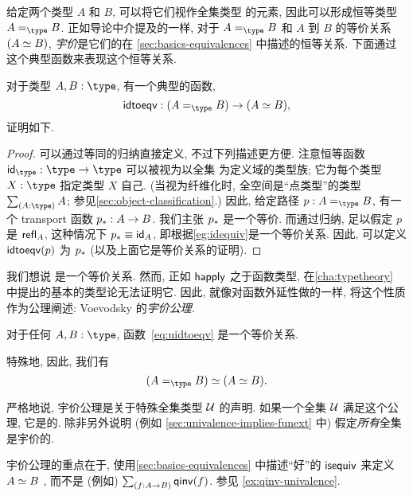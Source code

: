 %
%
给定两个类型 $A$ 和 $B$, 可以将它们视作全集类型 \type 的元素, 因此可以形成恒等类型 $\id[\type]AB$.
正如导论中介提及的一样, 对于 $\id[\type]AB$ 和 $A$ 到 $B$ 的等价关系 $(\eqv AB)$, \emph{宇价}是它们的在 \cref{sec:basics-equivalences} 中描述的恒等关系.
下面通过这个典型函数来表现这个恒等关系.

\begin{lem}\label{thm:idtoeqv}
  对于类型 $A,B:\type$, 有一个典型的函数,
  \begin{equation}\label{eq:uidtoeqv}
    \idtoeqv : (\id[\type]AB) \to (\eqv A B),
  \end{equation}
  证明如下.
\end{lem}
\begin{proof}
  可以通过等同的归纳直接定义, 不过下列描述更方便.
  注意恒等函数 $\idfunc[\type]:\type\to\type$ 可以被视为以全集 \type 为定义域的类型族; 它为每个类型 $X:\type$ 指定类型 $X$ 自己.
  (当视为纤维化时, 全空间是``点类型''的类型 $\sm{A:\type}A$; 参见\cref{sec:object-classification}.)
  因此, 给定路径 $p:A =_\type B$, 有一个 transport 函数 $\transf{p}:A \to B$.
  我们主张 $\transf{p}$ 是一个等价.
  而通过归纳, 足以假定 $p$ 是 $\refl A$, 这种情况下 $\transf{p} \jdeq \idfunc[A]$, 即根据\cref{eg:idequiv}是一个等价关系.
  因此, 可以定义 $\idtoeqv(p)$ 为 $\transf{p}$ (以及上面它是等价关系的证明).
\end{proof}

我们想说 \idtoeqv 是一个等价关系.
然而, 正如 $\happly$ 之于函数类型, 在\cref{cha:typetheory} 中提出的基本的类型论无法证明它.
因此, 就像对函数外延性做的一样, 将这个性质作为公理阐述: Voevodsky 的\emph{宇价公理}.

\begin{axiom}[Univalence]\label{axiom:univalence}
  对于任何 $A,B:\type$, 函数~\eqref{eq:uidtoeqv} 是一个等价关系.
\end{axiom}

特殊地, 因此, 我们有
  \[
\eqv{(\id[\type]{A}{B})}{(\eqv A B)}.
\]

严格地说, 宇价公理是关于特殊全集类型 $\UU$ 的声明.
如果一个全集 $\UU$ 满足这个公理, 它是的.
%
%
除非另外说明 (例如 \cref{sec:univalence-implies-funext} 中) 假定\emph{所有}全集是宇价的.

\begin{rmk}
  宇价公理的重点在于, 使用\cref{sec:basics-equivalences} 中描述``好''的 $\isequiv$ 来定义 $\eqv AB$ , 而不是 (例如) $\sm{f:A\to B} \qinv(f)$.
  参见 \cref{ex:qinv-univalence}.
\end{rmk}

